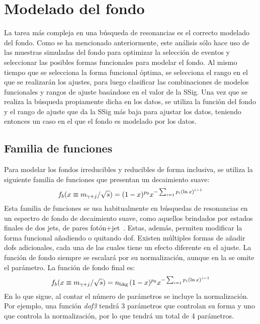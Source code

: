 \section{Modelado del fondo}
\label{sec:bkg:modeling}


La tarea más compleja en una búsqueda de resonancias es el correcto modelado del fondo. Como se ha mencionado anteriormente, este análisis sólo hace uso de las muestras simuladas del fondo para optimizar la selección de eventos y seleccionar las posibles formas funcionales para modelar el fondo. Al mismo tiempo que se selecciona la forma funcional óptima, se selecciona el rango en el que se realizarán los ajustes, para luego clasificar las combinaciones de modelos funcionales y rangos de ajuste basándose en el valor de la \acf{SSig}.
Una vez que se realiza la búsqueda propiamente dicha en los datos, se utiliza la función del fondo y el rango de ajuste que da la \ac{SSig} más baja para ajustar los datos, teniendo entonces un caso en el que el fondo es modelado por los datos.













\subsection{Familia de funciones}
\label{subsec:bkg:modeling:functions}

Para modelar los fondos irreducibles y reducibles de forma inclusiva, se utiliza la siguiente familia de funciones que presentan un decaimiento suave:
\begin{equation}
    \label{eq:bkg:modeling:functions:general_equation}
    f_{b}( x \equiv m_{\gamma+j} / \sqrt{s}) = (1-x)^{p_0} x^{-\sum_{i=1} p_i \left(\ln x\right)^{i-1}} 
\end{equation}
Esta familia de funciones se usa habitualmente en búsquedas de resonancias en un espectro de fondo de decaimiento suave, como aquellos brindados por estados finales de dos jets, de pares fotón+jet~\cite{ATLAS-Dijet-2019,ATLAS-PhotonJetResonances-2016}. Estas, además, permiten modificar la forma funcional añadiendo o quitando \ac{dof}. Existen múltiples formas de añadir \acp{dof} adicionales, cada una de las cuales tiene un efecto diferente en el ajuste. La función de fondo siempre se escalará por su normalización, aunque en la \Eqn{\ref{eq:bkg:modeling:functions:general_equation}} se omite el parámetro. La función de fondo final es:
\begin{equation}
    \label{eq:bkg:modeling:functions:general_equation_normalization}
    f_{b}( x \equiv m_{\gamma+j} / \sqrt{s}) = n_{\text{bkg}\, }(1-x)^{p_0} x^{-\sum_{i=1} p_i \left(\ln x\right)^{i-1}} 
\end{equation}
En lo que sigue, al contar el número de parámetros se incluye la normalización. Por ejemplo, una función \textit{dof3} tendrá 3 parámetros que controlan su forma y uno que controla la normalización, por lo que tendrá un total de 4 parámetros.

